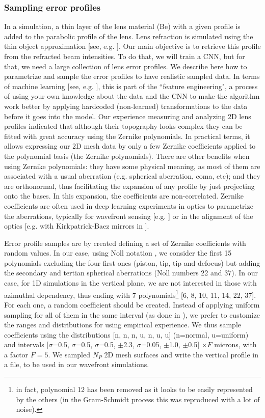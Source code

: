 \documentclass{iucr}
\begin{document}
\subsubsection{Sampling error profiles}
In a simulation, a thin layer of the lens material (Be) with a given profile is added to the parabolic profile of the lens. Lens refraction is simulated using the thin object approximation [see, e.g. \cite{multioptics, Celestre:yi5119}]. Our main objective is to retrieve this profile from the refracted beam intensities. To do that, we will train a CNN, but for that, we need a large collection of lens error profiles. We describe here how to parametrize and sample the error profiles to have realistic sampled data. In terms of machine learning [see, e.g. \cite{chollet_book}], this is part of the ``feature engineering", a process of using your own knowledge about the data and the CNN to make the algorithm work better by applying hardcoded (non-learned) transformations to the data before it goes into the model.
Our experience measuring and analyzing 2D lens profiles indicated that although their topography looks complex they can be fitted with great accuracy using the Zernike polynomials. In practical terms, it allows expressing our 2D mesh data by only a few Zernike coefficients applied to the polynomial basis (the Zernike polynomials). There are other benefits when using Zernike polynomials: they have some physical meaning, as most of them are associated with a usual aberration (e.g. spherical aberration, coma, etc); and they are orthonormal, thus facilitating the expansion of any profile by just projecting onto the bases. In this expansion, the coefficients are non-correlated. Zernike coefficients are often used in deep learning experiments in optics to parametrize the aberrations, typically for wavefront sensing [e.g. \cite{Saha2020}] or in the alignment of the optics [e.g. with Kirkpatrick-Baez mirrors in \cite{Luiz2022}]. 

Error profile samples are by created defining a set of Zernike coefficients with random values. In our case, using Noll notation \cite{Noll:76}, we consider the first 15 polynomials excluding the four first ones (piston, tip, tip and defocus) but adding the secondary and tertian spherical aberrations (Noll numbers 22 and 37). In our case, for 1D simulations in the vertical plane, we are not interested in those with azimuthal dependency, thus ending with 7 polynomials\footnote{in fact, polynomial 12 has been removed as it looks to be easily represented by the others (in the Gram-Schmidt process this was reproduced with a lot of noise). } [6, 8, 10, 11, 14, 22, 37]. For each one, a random coefficient should be created. Instead of applying uniform sampling for all of them in the same interval (as done in \cite{Saha2020}), we prefer to customize the ranges and distributions for using empirical experience. We thus sample coefficients using the distributions [n, n, n, u, n, u, u]  (n=normal, u=uniform) and intervals [$\sigma$=0.5, $\sigma$=0.5, $\sigma$=0.5, $\pm$2.3, $\sigma$=0.05, $\pm$1.0, $\pm$0.5] $\times F$ microns, with a factor $F=5$. We sampled $N_P$ 2D mesh surfaces and write the vertical profile in a file, to be used in our wavefront simulations.
\end{document}
